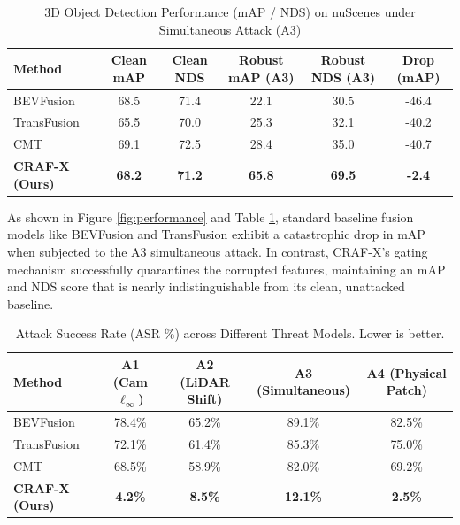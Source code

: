 \begin{table}[h]
\centering
\caption{3D Object Detection Performance (mAP / NDS) on nuScenes under Simultaneous Attack (A3)}
\begin{tabular}{lccccc}
\toprule
\textbf{Method} & \textbf{Clean mAP} & \textbf{Clean NDS} & \textbf{Robust mAP (A3)} & \textbf{Robust NDS (A3)} & \textbf{Drop (mAP)} \\
\midrule
BEVFusion \cite{LiuBEVFusion2023} & 68.5 & 71.4 & 22.1 & 30.5 & -46.4 \\
TransFusion \cite{BaiTransFusion2022} & 65.5 & 70.0 & 25.3 & 32.1 & -40.2 \\
CMT \cite{YanCMT2023} & 69.1 & 72.5 & 28.4 & 35.0 & -40.7 \\
\midrule
\textbf{CRAF-X (Ours)} & \textbf{68.2} & \textbf{71.2} & \textbf{65.8} & \textbf{69.5} & \textbf{-2.4} \\
\bottomrule
\end{tabular}
\label{tab:performance}
\end{table}

As shown in Figure \ref{fig:performance} and Table \ref{tab:performance}, standard baseline fusion models like BEVFusion and TransFusion exhibit a catastrophic drop in mAP when subjected to the A3 simultaneous attack. In contrast, CRAF-X's gating mechanism successfully quarantines the corrupted features, maintaining an mAP and NDS score that is nearly indistinguishable from its clean, unattacked baseline.

\begin{table}[h]
\centering
\caption{Attack Success Rate (ASR \%) across Different Threat Models. Lower is better.}
\begin{tabular}{lcccc}
\toprule
\textbf{Method} & \textbf{A1 (Cam $\ell_\infty$)} & \textbf{A2 (LiDAR Shift)} & \textbf{A3 (Simultaneous)} & \textbf{A4 (Physical Patch)} \\
\midrule
BEVFusion \cite{LiuBEVFusion2023} & 78.4\% & 65.2\% & 89.1\% & 82.5\% \\
TransFusion \cite{BaiTransFusion2022} & 72.1\% & 61.4\% & 85.3\% & 75.0\% \\
CMT \cite{YanCMT2023} & 68.5\% & 58.9\% & 82.0\% & 69.2\% \\
\midrule
\textbf{CRAF-X (Ours)} & \textbf{4.2\%} & \textbf{8.5\%} & \textbf{12.1\%} & \textbf{2.5\%} \\
\bottomrule
\end{tabular}
\label{tab:asr}
\end{table}


